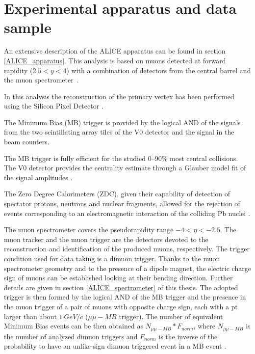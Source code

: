 \section{Experimental apparatus and data sample}

An extensive description of the ALICE apparatus can be found in section \ref{ALICE_apparatus}.
This analysis is based on muons detected at forward rapidity ($2.5<y<4$) with a combination of detectors from the central barrel and the muon spectrometer~\cite{Aamodt:2011gj}. 

In this analysis the reconstruction of the primary vertex has been performed using the Silicon Pixel Detector \cite{Aamodt:2010aa}.

The Minimum Bias (MB) trigger is provided by the logical AND of the signals from the two scintillating array tiles of the V0 detector \cite{Abbas:2013taa} and the signal in the beam counters.

The MB trigger is fully efficient for the studied 0--90\% most central collisions.
The V0 detector provides the centrality estimate through a Glauber model fit of the signal amplitudes \cite{Abelev:2013qoq,Adam:2015ptt}.

The Zero Degree Calorimeters (ZDC), given their capability of detection of spectator protons, neutrons and nuclear fragments, allowed for the rejection of events corresponding to an electromagnetic interaction of the colliding Pb nuclei \cite{ALICE:2012aa}.

The muon spectrometer covers the pseudorapidity range $-4<\eta<-2.5$.
The muon tracker and the muon trigger are the detectors devoted to the reconstruction and identification of the produced muons, respectively.
The trigger condition used for data taking is a dimuon trigger.
Thanks to the muon spectrometer geometry and to the presence of a dipole magnet, the electric charge sign of muons can be established looking at their bending direction.
Further details are given in section \ref{ALICE_spectrometer} of this thesis.
The adopted trigger is then formed by the logical AND of the MB trigger and the presence in the muon trigger of a pair of muons with opposite charge sign, each with a pt larger than about $1\ GeV/c$ ($\mu \mu-MB$ trigger). 
The number of equivalent Minimum Bias events can be then obtained as $N_{\mu \mu-MB} * F_{norm}$, where $N_{\mu \mu-MB}$ is the number of analyzed dimuon triggers and $F_{norm}$ is the inverse of the probability to have an unlike-sign dimuon triggered event in a MB event \cite{Adam:2016rdg}.

